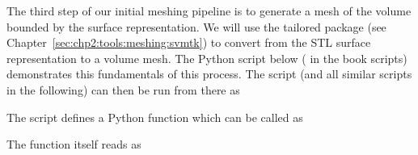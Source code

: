 The third step of our initial meshing pipeline is to generate a mesh
of the volume bounded by the surface representation. We will use the
tailored package \svmtk{} (see
Chapter~\ref{sec:chp2:tools:meshing:svmtk}) to convert from the STL
surface representation to a volume mesh. The Python script below (
 in the book scripts)
demonstrates this fundamentals of this process. The script (and all
similar scripts in the following) can then be run from there as

The script defines a Python function
 which can be called as

\noindent The function itself reads as

